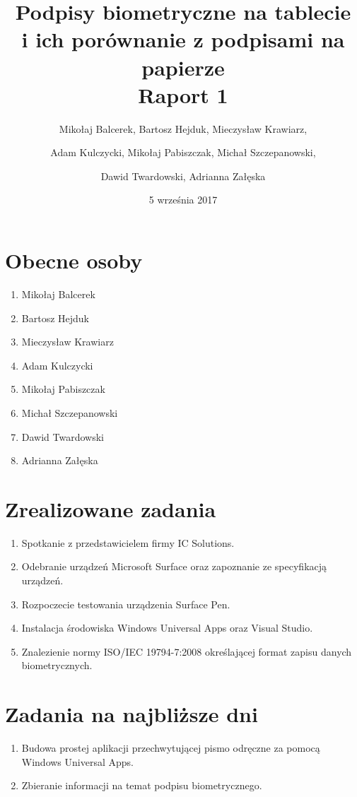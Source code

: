 \documentclass{mwrep}
\title{Podpisy biometryczne na tablecie \\ i ich porównanie z podpisami na papierze\\ 
Raport 1}
\author{Mikołaj Balcerek, Bartosz Hejduk, Mieczysław Krawiarz, \and Adam Kulczycki, Mikołaj Pabiszczak, Michał Szczepanowski, \and Dawid Twardowski, Adrianna Załęska}
\date{5 września 2017}
\begin{document}
\maketitle
{\let\clearpage\relax 
\chapter{Obecne osoby}}
\begin{enumerate}
    \item Mikołaj Balcerek
    \item Bartosz Hejduk
    \item Mieczysław Krawiarz
    \item Adam Kulczycki
    \item Mikołaj Pabiszczak
    \item Michał Szczepanowski
    \item Dawid Twardowski
    \item Adrianna Załęska
\end{enumerate}

{\let\clearpage\relax 
\chapter{Zrealizowane zadania}}
\begin{enumerate}
	\item Spotkanie z przedstawicielem firmy IC Solutions.
    \item Odebranie urządzeń Microsoft Surface oraz zapoznanie ze specyfikacją \\ urządzeń.
    \item Rozpoczecie testowania urządzenia Surface Pen.
    \item Instalacja środowiska Windows Universal Apps oraz Visual Studio.
    \item Znalezienie normy ISO/IEC 19794-7:2008 określającej format zapisu danych biometrycznych.
\end{enumerate}

{\let\clearpage\relax \chapter{Zadania na najbliższe dni}}
\begin{enumerate}
    \item Budowa prostej aplikacji przechwytującej pismo odręczne za pomocą Windows Universal Apps.
    \item Zbieranie informacji na temat podpisu biometrycznego.
\end{enumerate}
\end{document}
